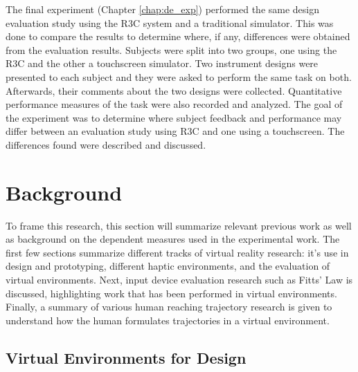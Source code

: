 The final experiment (Chapter \ref{chap:de_exp}) performed the same design evaluation study using the R3C system and a traditional simulator.
This was done to compare the results to determine where, if any, differences were obtained from the evaluation results.
Subjects were split into two groups, one using the R3C and the other a touchscreen simulator.
Two instrument designs were presented to each subject and they were asked to perform the same task on both.
Afterwards, their comments about the two designs were collected.
Quantitative performance measures of the task were also recorded and analyzed.
The goal of the experiment was to determine where subject feedback and performance may differ between an evaluation study using R3C and one using a touchscreen.
The differences found were described and discussed.

\section{Background}

To frame this research, this section will summarize relevant previous work as well as background on the dependent measures used in the experimental work.
The first few sections summarize different tracks of virtual reality research: it's use in design and prototyping, different haptic environments, and the evaluation of virtual environments.
Next, input device evaluation research such as Fitts' Law is discussed, highlighting work that has been performed in virtual environments.
Finally, a summary of various human reaching trajectory research is given to understand how the human formulates trajectories in a virtual environment.

\subsection{Virtual Environments for Design}

